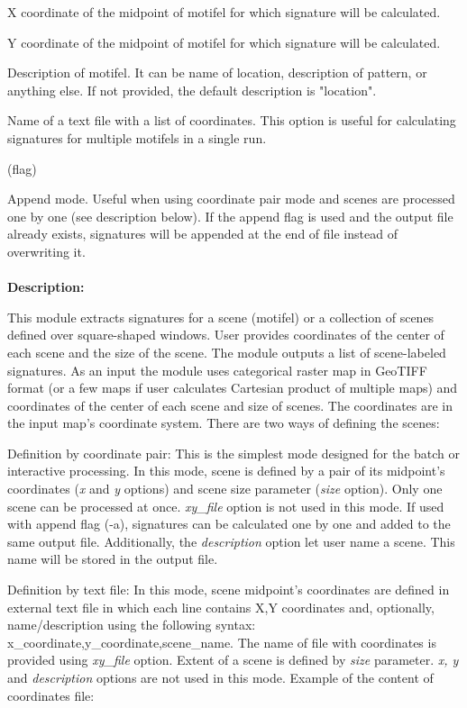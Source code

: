 
X coordinate of the midpoint of motifel for which signature will be calculated.


Y coordinate of the midpoint of motifel for which signature will be calculated.


Description of motifel. It can be name of location, description of pattern, or anything else. If not provided, the default description is "location".


Name of a text file with a list of coordinates. This option is useful for calculating signatures for multiple motifels in a single run. %

 (flag)

Append mode. Useful when using coordinate pair mode and scenes are processed one by one (see description below). If the append flag is used and the output file already exists, signatures will be appended at the end of file instead of overwriting it.
\\\\
{\bf Description:}

This module extracts signatures for a scene (motifel) or a collection of scenes defined over square-shaped windows. User provides coordinates of the center of each scene and the size of the scene. The module outputs a list of scene-labeled signatures.
As an input the module uses categorical raster map in GeoTIFF format (or a few maps if user calculates Cartesian product of multiple maps) and coordinates of the center of each scene and size of scenes. The coordinates are in the input map's coordinate system. There are two ways of defining the scenes:

Definition by coordinate pair: 
This is the simplest mode designed for the batch or interactive processing. In this mode, scene is defined by a pair of its midpoint's coordinates ({\it x} and {\it y} options) and scene size parameter ({\it size} option). Only one scene can be processed at once. {\it xy\_file} option is not used in this mode.
If used with append flag (-a), signatures can be calculated one by one and added to the same output file. Additionally, the {\it description} option let user name a scene. This name will be stored in the output file.

Definition by text file:
In this mode, scene midpoint's coordinates are defined in external text file in which each line contains X,Y coordinates and, optionally, name/description using the following syntax: x\_coordinate,y\_coordinate,scene\_name. The name of file with coordinates is provided using {\it xy\_file} option. Extent of a scene is defined by {\it size} parameter. {\it x, y} and {\it description} options are not used in this mode. Example of the content of coordinates file: 

